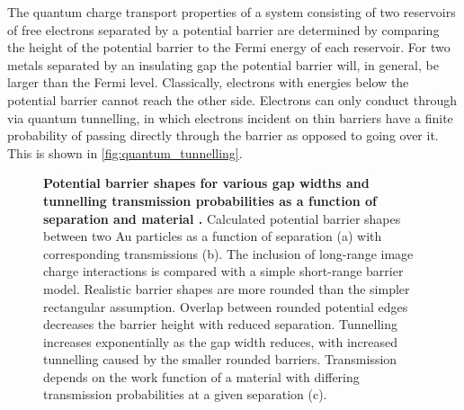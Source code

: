 \documentclass{article}
\begin{document}
The quantum charge transport properties of a system consisting of two reservoirs of free electrons separated by a potential barrier are determined by comparing the height of the potential barrier to the Fermi energy of each reservoir. For two metals separated by an insulating gap the potential barrier will, in general, be larger than the Fermi level. Classically, electrons with energies below the potential barrier cannot reach the other side. Electrons can only conduct through via quantum tunnelling, in which electrons incident on thin barriers have a finite probability of passing directly through the barrier as opposed to going over it. This is shown in \autoref{fig:quantum_tunnelling}.

\begin{figure}[bt]
\centering
{}
\caption[Potential barrier shapes for various gap widths and tunnelling transmission probabilities as a function of separation and material \cite{esteban2015}]{\textbf{Potential barrier shapes for various gap widths and tunnelling transmission probabilities as a function of separation and material \cite{esteban2015}.} Calculated potential barrier shapes between two Au particles as a function of separation (a) with corresponding transmissions (b). The inclusion of long-range image charge interactions is compared with a simple short-range barrier model. Realistic barrier shapes are more rounded than the simpler rectangular assumption. Overlap between rounded potential edges decreases the barrier height with reduced separation. Tunnelling increases exponentially as the gap width reduces, with increased tunnelling caused by the smaller rounded barriers. Transmission depends on the work function of a material with differing transmission probabilities at a given separation (c).}
\label{fig:esteban_tunnelling}
\end{figure}
\end{document}
